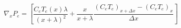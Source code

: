 \documentclass[12pt]{article}
\begin{document}
$$ 
  \nabla_x P_e = \left[\frac{C_e{}T_e(x)\lambda}{(x+\lambda)^2} + \frac{x}{x+\lambda}\frac{(C_e{}T_e)_{x+\Delta x}-(C_e{}T_e)_{x}}{\Delta x} \right]
$$
\end{document}
